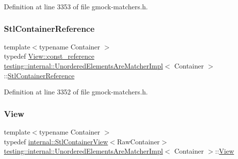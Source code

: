 Definition at line 3353 of file gmock-\/matchers.\+h.

\mbox{\label{classtesting_1_1internal_1_1UnorderedElementsAreMatcherImpl_acf64d0e328361d4796bcf1aeb91ed975}} 
\subsubsection{\texorpdfstring{Stl\+Container\+Reference}{StlContainerReference}}
{\footnotesize\ttfamily template$<$typename Container $>$ \\
typedef \hyperlink{classtesting_1_1internal_1_1StlContainerView_a9cd4f6ed689b3938cdb7b3c4cbf1b36b}{View\+::const\+\_\+reference} \hyperlink{classtesting_1_1internal_1_1UnorderedElementsAreMatcherImpl}{testing\+::internal\+::\+Unordered\+Elements\+Are\+Matcher\+Impl}$<$ Container $>$\+::\hyperlink{classtesting_1_1internal_1_1UnorderedElementsAreMatcherImpl_acf64d0e328361d4796bcf1aeb91ed975}{Stl\+Container\+Reference}}



Definition at line 3352 of file gmock-\/matchers.\+h.

\mbox{\label{classtesting_1_1internal_1_1UnorderedElementsAreMatcherImpl_adbd6dfef7713dd30d569b4220eb808d3}} 
\subsubsection{\texorpdfstring{View}{View}}
{\footnotesize\ttfamily template$<$typename Container $>$ \\
typedef \hyperlink{classtesting_1_1internal_1_1StlContainerView}{internal\+::\+Stl\+Container\+View}$<$Raw\+Container$>$ \hyperlink{classtesting_1_1internal_1_1UnorderedElementsAreMatcherImpl}{testing\+::internal\+::\+Unordered\+Elements\+Are\+Matcher\+Impl}$<$ Container $>$\+::\hyperlink{classtesting_1_1internal_1_1UnorderedElementsAreMatcherImpl_adbd6dfef7713dd30d569b4220eb808d3}{View}}



